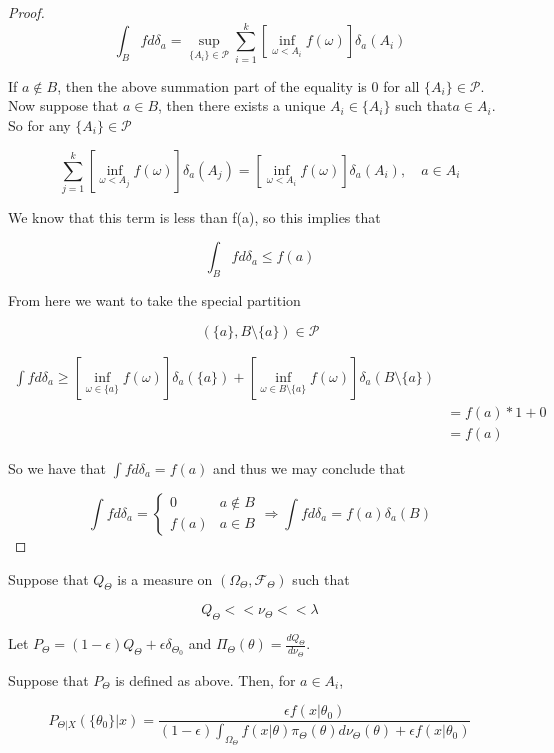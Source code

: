\documentclass[11pt,fleqn]{book} %
\begin{document}
\begin{proof}
			
		$$\int_B f d\delta_a = \sup_{\{A_i\} \in \mathcal{P}} \sum^k_{i=1}[\inf_{\omega < A_i} f(\omega)] \delta_a(A_i) $$

If $a \notin B$, then the above summation part of the equality is 0 for all $\{A_i\} \in \mathcal{P}$.\\

Now suppose that $a \in B$, then there exists a unique $A_i \in \{A_i\}$ such that$a \in A_i$.\\

So for any $\{A_i\} \in \mathcal{P}$ 

		$$ \sum^k_{j=1}[\inf_{\omega < A_j} f(\omega)] \delta_a(A_j) = [\inf_{\omega < A_i} f(\omega)] \delta_a(A_i), \quad a \in A_i$$

We know that this term is less than f(a), so this implies that

		$$\int_B f d\delta_a \leq f(a) $$

From here we want to take the special partition

		$$(\{a\}, B\setminus \{a\}) \in \mathcal{P} $$

		\begin{align*}
			\int f d \delta_a \geq [\inf_{\omega \in \{a\}} f(\omega)] \delta_a(\{a\}) + [\inf_{\omega \in B \setminus \{a\}} f(\omega)] \delta_a(B\setminus \{a\})\\
				&= f(a)*1 + 0\\
				&=f(a)
		\end{align*}

So we have that $\int f d \delta_a = f(a)$ and thus we may conclude that 

		$$\int f d \delta_a = \left\{\begin{array}{ll}
			0 & a \notin B\\
			f(a) & a \in B
		\end{array} \right. \Rightarrow \int f d \delta_a = f(a) \delta_a(B)  $$
\end{proof}

Suppose that $Q_\Theta$ is a measure on $(\Omega_\Theta, \mathcal{F}_\Theta)$ such that 

		$$Q_\Theta << \nu_\Theta << \lambda $$

	Let $P_\Theta = (1 - \epsilon)Q_\Theta + \epsilon \delta_{\Theta_0}$ and $\Pi_\Theta(\theta) = \frac{d Q_\Theta}{d \nu_\Theta}$. 

\begin{theorem}[2.6]
	Suppose that $P_\Theta$ is defined as above. Then, for $a \in A_i$, 

		$$P_{\Theta|X}(\{\theta_0\}|x) = \frac{\epsilon f(x|\theta_0)}{(1 - \epsilon)\int_{\Omega_\Theta} f(x|\theta) \pi_\Theta(\theta) d \nu_\Theta(\theta) + \epsilon f(x|\theta_0)} $$

\end{theorem}
\end{document}
